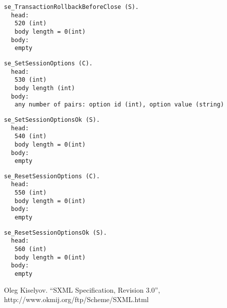 \documentclass[a4paper,12pt]{article}
\begin{document}
\begin{verbatim}
se_TransactionRollbackBeforeClose (S).
  head:
   520 (int)
   body length = 0(int)
  body:
   empty
\end{verbatim}

\begin{verbatim}
se_SetSessionOptions (C).
  head:
   530 (int)
   body length (int)
  body:
   any number of pairs: option id (int), option value (string)
\end{verbatim}

\begin{verbatim}
se_SetSessionOptionsOk (S).
  head:
   540 (int)
   body length = 0(int)
  body:
   empty
\end{verbatim}

\begin{verbatim}
se_ResetSessionOptions (C).
  head:
   550 (int)
   body length = 0(int)
  body:
   empty
\end{verbatim}

\begin{verbatim}
se_ResetSessionOptionsOk (S).
  head:
   560 (int)
   body length = 0(int)
  body:
   empty
\end{verbatim}

\begin{thebibliography}{1}

Oleg Kiselyov.
``SXML Specification, Revision 3.0'',
http://www.okmij.org/ftp/Scheme/SXML.html
\end{thebibliography}
\end{document}
